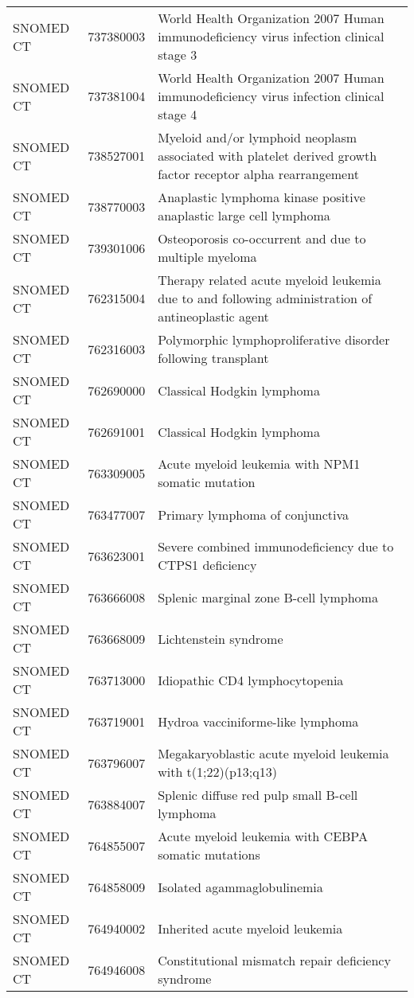 \begin{longtable}{p{}p{}p{}}
  SNOMED CT & 737380003 & World Health Organization 2007 Human immunodeficiency virus infection clinical stage 3 \\ 
  SNOMED CT & 737381004 & World Health Organization 2007 Human immunodeficiency virus infection clinical stage 4 \\ 
  SNOMED CT & 738527001 & Myeloid and/or lymphoid neoplasm associated with platelet derived growth factor receptor alpha rearrangement \\ 
  SNOMED CT & 738770003 & Anaplastic lymphoma kinase positive anaplastic large cell lymphoma \\ 
  SNOMED CT & 739301006 & Osteoporosis co-occurrent and due to multiple myeloma \\ 
  SNOMED CT & 762315004 & Therapy related acute myeloid leukemia due to and following administration of antineoplastic agent \\ 
  SNOMED CT & 762316003 & Polymorphic lymphoproliferative disorder following transplant \\ 
  SNOMED CT & 762690000 & Classical Hodgkin lymphoma \\ 
  SNOMED CT & 762691001 & Classical Hodgkin lymphoma \\ 
  SNOMED CT & 763309005 & Acute myeloid leukemia with NPM1 somatic mutation \\ 
  SNOMED CT & 763477007 & Primary lymphoma of conjunctiva \\ 
  SNOMED CT & 763623001 & Severe combined immunodeficiency due to CTPS1 deficiency \\ 
  SNOMED CT & 763666008 & Splenic marginal zone B-cell lymphoma \\ 
  SNOMED CT & 763668009 & Lichtenstein syndrome \\ 
  SNOMED CT & 763713000 & Idiopathic CD4 lymphocytopenia \\ 
  SNOMED CT & 763719001 & Hydroa vacciniforme-like lymphoma \\ 
  SNOMED CT & 763796007 & Megakaryoblastic acute myeloid leukemia with t(1;22)(p13;q13) \\ 
  SNOMED CT & 763884007 & Splenic diffuse red pulp small B-cell lymphoma \\ 
  SNOMED CT & 764855007 & Acute myeloid leukemia with CEBPA somatic mutations \\ 
  SNOMED CT & 764858009 & Isolated agammaglobulinemia \\ 
  SNOMED CT & 764940002 & Inherited acute myeloid leukemia \\ 
  SNOMED CT & 764946008 & Constitutional mismatch repair deficiency syndrome \\ 

\end{longtable}
